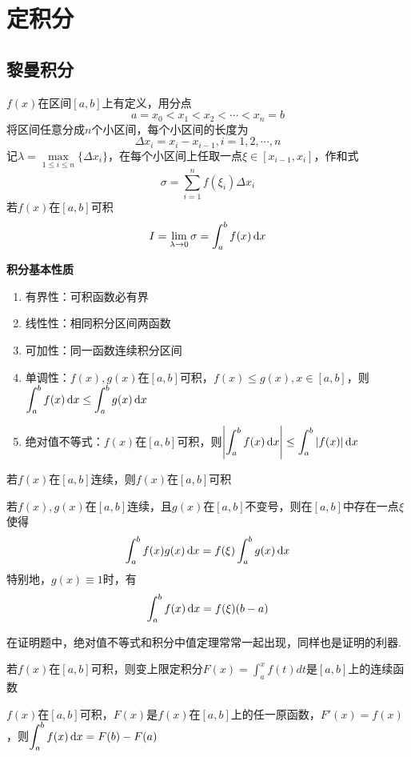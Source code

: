 
\section{定积分}
\label{sec:definite_integration}
\subsection{黎曼积分}
\begin{definition}[Riemann积分]
$f(x)$在区间$[a,b]$上有定义，用分点
\[a=x_0<x_1<x_2<\cdots<x_n=b\]
将区间任意分成$n$个小区间，每个小区间的长度为
\[\Delta x_i=x_i-x_{i-1},i=1,2,\cdots,n\]
记$\lambda = \underset{1\leq i\leq n}{\max}\{\Delta x_i\}$，在每个小区间上任取一点$\xi\in[x_{i-1},x_i]$，作和式
\[\sigma = \sum_{i=1}^{n}f(\xi_i)\Delta x_i\]
若$f(x)$在$[a,b]$可积
\[I=\lim_{\lambda\to 0}\sigma=\int_a^bf(x)\,\mathrm{d} x\]
\end{definition}
\par\textbf{积分基本性质}
\begin{enumerate}
	\item 有界性：可积函数必有界
	\item 线性性：相同积分区间两函数
	\item 可加性：同一函数连续积分区间
	\item 单调性：$f(x),g(x)$在$[a,b]$可积，$f(x)\leq g(x),x\in[a,b]$，则$\displaystyle\int_{a}^{b}f(x)\,\mathrm{d} x\leq\int_{a}^{b}g(x)\,\mathrm{d} x$
	\item 绝对值不等式：$f(x)$在$[a,b]$可积，则$\displaystyle\left|\int_{a}^{b}f(x)\,\mathrm{d} x\right|\leq\int_{a}^{b}|f(x)|\,\mathrm{d} x$
\end{enumerate}
\begin{theorem}[闭区间连续函数可积定理]
若$f(x)$在$[a,b]$连续，则$f(x)$在$[a,b]$可积
\end{theorem}
\begin{theorem}[积分第一中值定理]
若$f(x),g(x)$在$[a,b]$连续，且$g(x)$在$[a,b]$不变号，则在$[a,b]$中存在一点$\xi$使得
\[\int_a^bf(x)g(x)\,\mathrm{d} x=f(\xi)\int_a^bg(x)\,\mathrm{d} x\]
特别地，$g(x)\equiv 1$时，有
\[\int_a^bf(x)\,\mathrm{d} x=f(\xi)(b-a)\]
\end{theorem}
\par 在证明题中，绝对值不等式和积分中值定理常常一起出现，同样也是证明的利器.
\begin{theorem}
若$f(x)$在$[a,b]$可积，则变上限定积分$\displaystyle F(x)=\int_a^x f(t)dt$是$[a,b]$上的连续函数
\end{theorem}
\begin{theorem}[微积分基本定理]
$f(x)$在$[a,b]$可积，$F(x)$是$f(x)$在$[a,b]$上的任一原函数，$F'(x)=f(x)$，则$\displaystyle\int_{a}^{b}f(x)\,\mathrm{d} x=F(b)-F(a)$
\end{theorem}
